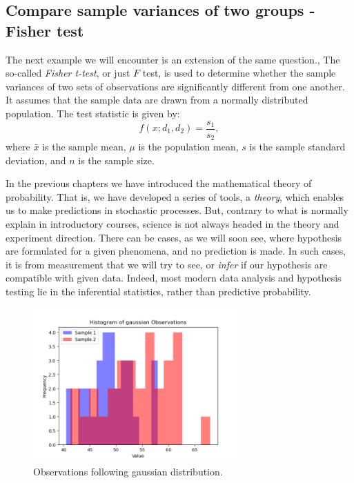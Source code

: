 \documentclass{book}
\begin{document}
\newpage
\subsection{Compare sample variances of two groups - Fisher test}

The next example we will encounter is an extension of the same question., The so-called \textit{Fisher t-test}, or just $F$ test, is used to determine whether the sample variances of two sets of observations are significantly different from one another. It assumes that the sample data are drawn from a normally distributed population. The test statistic is given by:
\[
    f(x; d_{1}, d_{2}) = \frac{s_1}{s_2},
\]
where $\bar{x}$ is the sample mean, $\mu$ is the population mean, $s$ is the sample standard deviation, and $n$ is the sample size.

In the previous chapters we have introduced the mathematical theory of probability. That is, we have developed a series of tools, a \textit{theory}, which enables us to make predictions in stochastic processes. But, contrary to what is normally explain in introductory courses, science is not always headed in the theory and experiment direction. There can be cases, as we will soon see, where hypothesis are formulated for a given phenomena, and no prediction is made. In such cases, it is from measurement that we will try to see, or \textit{infer} if our hypothesis are compatible with given data. Indeed, most modern data analysis and hypothesis testing lie in the inferential statistics, rather than predictive probability.

\begin{figure}[ht]
    \centering
    \includegraphics[width=0.7\textwidth]{figures/chapter4/f_observations.png}
    \caption{Observations following gaussian distribution.}
    \label{fig:f_obs}
\end{figure}
\end{document}
